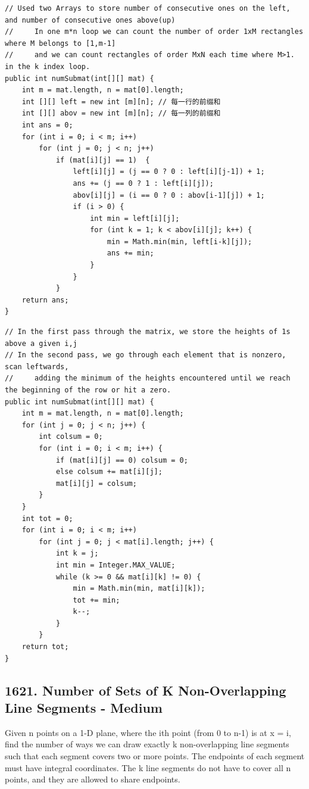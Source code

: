 \documentclass[9pt, b5paaper]{book}
\begin{document}
\begin{enumerate}
\begin{verbatim}
// Used two Arrays to store number of consecutive ones on the left, and number of consecutive ones above(up)
//     In one m*n loop we can count the number of order 1xM rectangles where M belongs to [1,m-1]
//     and we can count rectangles of order MxN each time where M>1. in the k index loop.
public int numSubmat(int[][] mat) {
    int m = mat.length, n = mat[0].length;
    int [][] left = new int [m][n]; // 每一行的前缀和
    int [][] abov = new int [m][n]; // 每一列的前缀和
    int ans = 0;
    for (int i = 0; i < m; i++) 
        for (int j = 0; j < n; j++) 
            if (mat[i][j] == 1)  {
                left[i][j] = (j == 0 ? 0 : left[i][j-1]) + 1;
                ans += (j == 0 ? 1 : left[i][j]);
                abov[i][j] = (i == 0 ? 0 : abov[i-1][j]) + 1;
                if (i > 0) {
                    int min = left[i][j];
                    for (int k = 1; k < abov[i][j]; k++) {
                        min = Math.min(min, left[i-k][j]);
                        ans += min;
                    }
                }
            }
    return ans;
}
\end{verbatim}
\begin{verbatim}
// In the first pass through the matrix, we store the heights of 1s above a given i,j
// In the second pass, we go through each element that is nonzero, scan leftwards,
//     adding the minimum of the heights encountered until we reach the beginning of the row or hit a zero.
public int numSubmat(int[][] mat) {
    int m = mat.length, n = mat[0].length;
    for (int j = 0; j < n; j++) {
        int colsum = 0;
        for (int i = 0; i < m; i++) {
            if (mat[i][j] == 0) colsum = 0;
            else colsum += mat[i][j];
            mat[i][j] = colsum;
        }
    }
    int tot = 0;
    for (int i = 0; i < m; i++) 
        for (int j = 0; j < mat[i].length; j++) {
            int k = j;
            int min = Integer.MAX_VALUE;
            while (k >= 0 && mat[i][k] != 0) {
                min = Math.min(min, mat[i][k]);
                tot += min;
                k--;
            }
        }
    return tot;
}
\end{verbatim}
\end{enumerate}
\subsection{1621. Number of Sets of K Non-Overlapping Line Segments - Medium}
\label{sec-1-5-5}
Given n points on a 1-D plane, where the ith point (from 0 to n-1) is at x = i, find the number of ways we can draw exactly k non-overlapping line segments such that each segment covers two or more points. The endpoints of each segment must have integral coordinates. The k line segments do not have to cover all n points, and they are allowed to share endpoints.
\end{document}
